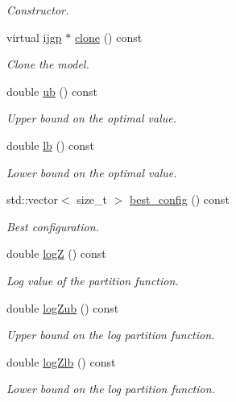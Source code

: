 \begin{DoxyCompactItemize}
\begin{DoxyCompactList}\small\item\em Constructor. \end{DoxyCompactList}\item 
virtual \hyperlink{classmerlin_1_1ijgp}{ijgp} $\ast$ \hyperlink{classmerlin_1_1ijgp_af3ecb1e386de25e892d3246e9fd14a1e}{clone} () const 
\begin{DoxyCompactList}\small\item\em Clone the model. \end{DoxyCompactList}\item 
double \hyperlink{classmerlin_1_1ijgp_aa5813f62d79f2a2c2fcdb24cbc967040}{ub} () const 
\begin{DoxyCompactList}\small\item\em Upper bound on the optimal value. \end{DoxyCompactList}\item 
double \hyperlink{classmerlin_1_1ijgp_ae4313682960f210fc937627446fb70cf}{lb} () const 
\begin{DoxyCompactList}\small\item\em Lower bound on the optimal value. \end{DoxyCompactList}\item 
std\+::vector$<$ size\+\_\+t $>$ \hyperlink{classmerlin_1_1ijgp_af54b5585c353a821071a1ac1f0570679}{best\+\_\+config} () const 
\begin{DoxyCompactList}\small\item\em Best configuration. \end{DoxyCompactList}\item 
double \hyperlink{classmerlin_1_1ijgp_afb334bdd8a981984f1f97ce0d5c58bed}{log\+Z} () const 
\begin{DoxyCompactList}\small\item\em Log value of the partition function. \end{DoxyCompactList}\item 
double \hyperlink{classmerlin_1_1ijgp_ac0851bfb0a95f0a8ff4b00af298bf743}{log\+Zub} () const 
\begin{DoxyCompactList}\small\item\em Upper bound on the log partition function. \end{DoxyCompactList}\item 
double \hyperlink{classmerlin_1_1ijgp_aa19a722eda63c9471795aff804985d4e}{log\+Zlb} () const 
\begin{DoxyCompactList}\small\item\em Lower bound on the log partition function. \end{DoxyCompactList}\item 

\end{DoxyCompactItemize}

